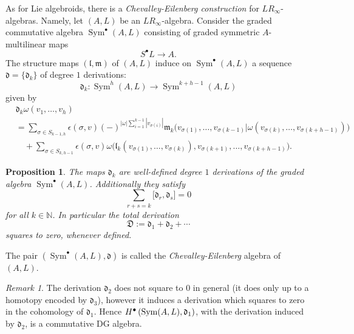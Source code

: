 \documentclass{conm-p-l}
\newtheorem{proposition}[theorem]{Proposition}
\theoremstyle{definition}
\theoremstyle{remark}
\newtheorem{remark}[theorem]{Remark}
\numberwithin{equation}{section}
\begin{document}
As for Lie algebroids, there is a \emph{Chevalley-Eilenberg construction} for $LR_\infty$-algebras. Namely, let $(A, L)$ be an $LR_\infty$-algebra. Consider the graded commutative algebra $\operatorname{Sym}^\bullet(A, L)$ consisting of graded symmetric $A$-multilinear maps
\[
S^\bullet L \to A.
\]
The structure maps $(\mathfrak l, \mathfrak m)$ of $(A, L)$ induce on $\operatorname{Sym}^\bullet (A, L)$ a sequence $\mathfrak d = \{ \mathfrak d_k\}$ of degree $1$ derivations:
\begin{equation}\label{eq:d_Sym}
\mathfrak d_k : \operatorname{Sym}^h (A, L) \to \operatorname{Sym}^{k+h-1} (A, L)
\end{equation}
given by
\[
\begin{aligned}
&\mathfrak d_k \omega (v_1, \ldots, v_{h}) \\
& = \sum_{\sigma \in S_{k-1,h}} \epsilon(\sigma, v) (-)^{|\omega| \sum_{i = 1}^{k-1}|v_{\sigma(i)}|}
\mathfrak m_k \big(v_{\sigma(1)}, \ldots, v_{\sigma(k-1)}|\omega (v_{\sigma (k)}, \ldots, v_{\sigma (k+h-1)})\big) \\
& \quad + \sum_{\sigma \in S_{k, h-1}} \epsilon(\sigma, v) \omega \big(\mathfrak l_k (v_{\sigma(1)}, \ldots, v_{\sigma (k)}), v_{\sigma (k+1)}, \ldots, v_{\sigma (k+h-1)}\big).
\end{aligned}
\]

\begin{proposition}
The maps $\mathfrak d_k$ are well-defined degree $1$ derivations of the graded algebra $\operatorname{Sym}^\bullet(A, L)$. Additionally they satisfy
\begin{equation}\label{eq:d_d}
\sum_{r+s = k} \big[\mathfrak d_r, \mathfrak d_s \big] = 0
\end{equation}
for all $k \in \mathbb N$. In particular the total derivation
\[
\mathfrak D := \mathfrak d_1 + \mathfrak d_2 + \cdots
\]
squares to zero, whenever defined. 
\end{proposition}

The pair $(\operatorname{Sym}^\bullet(A, L), \mathfrak d)$ is called the \emph{Chevalley-Eilenberg} algebra of $(A, L)$.

\begin{remark}\label{rem:DGA_cohom}
The derivation $\mathfrak d_2$ does not square to $0$ in general (it does only up to a homotopy encoded by $\mathfrak d_3$), however it induces a derivation which squares to zero in the cohomology of $\mathfrak d_1$. Hence 
$
H^\bullet \left( \operatorname{Sym}(A, L), \frak d_1\right)
$, with the derivation induced by $\mathfrak d_2$, is a commutative DG algebra.
\end{remark}
\end{document}
